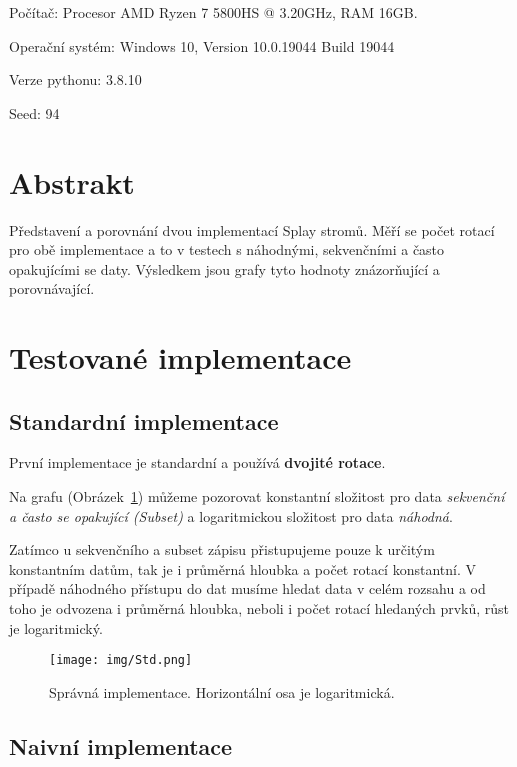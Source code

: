 \documentclass[a4paper]{article}
\author{David Napravnik}
\begin{document}
  \pagestyle{fancy}

	Počítač: Procesor AMD Ryzen 7 5800HS @ 3.20GHz, RAM 16GB.
	
	Operační systém: Windows 10, Version 10.0.19044 Build 19044
	
	Verze pythonu: 3.8.10

    Seed: 94

	\section{Abstrakt}
	Představení a porovnání dvou implementací Splay stromů.
	Měří se počet rotací pro obě implementace a to v testech s náhodnými, sekvenčními a často opakujícími se daty.
	Výsledkem jsou grafy tyto hodnoty znázorňující a porovnávající.
	
	\section{Testované implementace}

	\subsection{Standardní implementace}

    První implementace je standardní a používá \textbf{dvojité rotace}.

	Na grafu (Obrázek~\ref{fig:1_standard}) můžeme pozorovat konstantní složitost pro data \textit{sekvenční a často se opakující (Subset)} a
	logaritmickou složitost pro data \textit{náhodná}.

	Zatímco u sekvenčního a subset zápisu přistupujeme pouze k určitým konstantním datům, tak je i průměrná hloubka a počet rotací konstantní.
	V případě náhodného přístupu do dat musíme hledat data v celém rozsahu a od toho je odvozena i průměrná hloubka,
	neboli i počet rotací hledaných prvků, růst je logaritmický.
	
	
	\begin{figure}[H]
		\centering
		\texttt{[image: img/Std.png]}
	 \caption{Správná implementace. Horizontální osa je logaritmická.}
		\label{fig:1_standard}
	\end{figure}


	\pagebreak
	\subsection{Naivní implementace}
\end{document}
